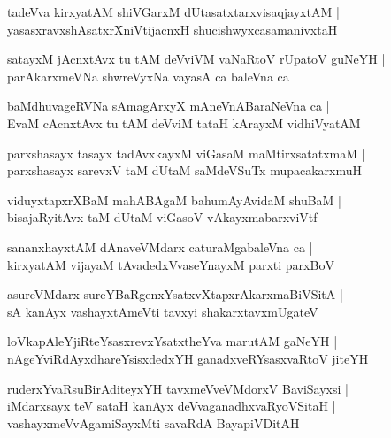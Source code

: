 \begin{shloka}
tadeVva kirxyatAM shiVGarxM dUtasatxtarxvisaqjayxtAM |\\
yasasxravxshAsatxrXniVtijacnxH shucishwyxcasamanivxtaH 
\end{shloka}

\begin{shloka}
satayxM jAcnxtAvx tu tAM deVviVM vaNaRtoV rUpatoV guNeYH |\\
parAkarxmeVNa shwreVyxNa vayasA ca baleVna ca 
\end{shloka}

\begin{shloka}
baMdhuvageRVNa sAmagArxyX mAneVnABaraNeVna ca |\\
EvaM cAcnxtAvx tu tAM deVviM tataH kArayxM vidhiVyatAM 
\end{shloka}

\begin{shloka}
parxshasayx tasayx tadAvxkayxM viGasaM maMtirxsatatxmaM |\\
parxshasayx sarevxV taM dUtaM saMdeVSuTx mupacakarxmuH 
\end{shloka}

\begin{shloka}
viduyxtapxrXBaM mahABAgaM bahumAyAvidaM shuBaM |\\
bisajaRyitAvx taM dUtaM viGasoV vAkayxmabarxviVtf 
\end{shloka}

\begin{shloka}
sananxhayxtAM dAnaveVMdarx caturaMgabaleVna ca |\\
kirxyatAM vijayaM tAvadedxVvaseYnayxM parxti parxBoV
\end{shloka}

\begin{shloka}
asureVMdarx sureYBaRgenxYsatxvXtapxrAkarxmaBiVSitA |\\
sA kanAyx vashayxtAmeVti tavxyi shakarxtavxmUgateV
\end{shloka}

\begin{shloka}
loVkapAleYjiRteYsasxrevxYsatxtheYva marutAM gaNeYH |\\
nAgeYviRdAyxdhareYsisxdedxYH ganadxveRYsasxvaRtoV jiteYH 
\end{shloka}

\begin{shloka}
ruderxYvaRsuBirAditeyxYH tavxmeVveVMdorxV BaviSayxsi |\\
iMdarxsayx teV sataH kanAyx deVvaganadhxvaRyoVSitaH |\\
vashayxmeVvAgamiSayxMti savaRdA BayapiVDitAH 
\end{shloka}

